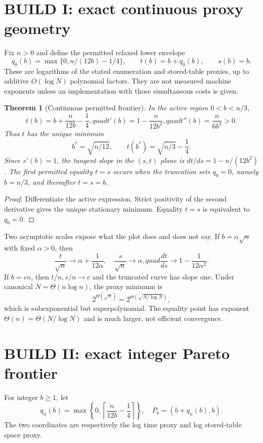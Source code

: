 \documentclass[11pt]{article}
\newtheorem{theorem}{Theorem}
\begin{document}
\section{BUILD I: exact continuous proxy geometry}
Fix $n>0$ and define the permitted relaxed lower envelope
\[
 q_0(b)=\max\{0,n/(12b)-1/4\},\qquad
 t(b)=b+q_0(b),\qquad s(b)=b.
\]
These are logarithms of the stated enumeration and stored-table proxies,
up to additive $O(\log N)$ polynomial factors.  They are not measured machine
exponents unless an implementation with those simultaneous costs is given.

\begin{theorem}[Continuous permitted frontier]
In the active region $0<b<n/3$,
\[
 t(b)=b+\frac{n}{12b}-\frac14,quad
 t'(b)=1-\frac{n}{12b^2},quad
 t''(b)=\frac{n}{6b^3}>0. \tag{1}
\]
Thus $t$ has the unique minimum
\[
 b^*=\sqrt{n/12},\qquad
 t(b^*)=\sqrt{n/3}-\frac14. \tag{2}
\]
Since $s'(b)=1$, the tangent slope in the $(s,t)$ plane is
$dt/ds=1-n/(12b^2)$.  The first permitted equality $t=s$ occurs when the
truncation sets $q_0=0$, namely $b=n/3$, and thereafter $t=s=b$.
\end{theorem}
\begin{proof}
Differentiate the active expression.  Strict positivity of the second
derivative gives the unique stationary minimum.  Equality $t=s$ is equivalent
to $q_0=0$.
\end{proof}

Two asymptotic scales expose what the plot does and does not say.  If
$b=\alpha\sqrt n$ with fixed $\alpha>0$, then
\[
 \frac{t}{\sqrt n}\longrightarrow
 \alpha+\frac{1}{12\alpha},\quad
 \frac{s}{\sqrt n}\longrightarrow\alpha,quad
 \frac{dt}{ds}\longrightarrow1-\frac{1}{12\alpha^2}. \tag{3}
\]
If $b=cn$, then $t/n,s/n\to c$ and the truncated curve has slope one.
Under canonical $N=\Theta(n\log n)$, the proxy minimum is
\[
 2^{\Theta(\sqrt n)}=
 2^{\Theta(\sqrt{N/\log N})}, \tag{4}
\]
which is subexponential but superpolynomial.  The equality point has exponent
$\Theta(n)=\Theta(N/\log N)$ and is much larger, not efficient convergence.

\section{BUILD II: exact integer Pareto frontier}
For integer $b\ge1$, let
\[
 q_n(b)=\max\left\{0,
 \left\lceil\frac{n}{12b}-\frac14\right\rceil\right\},
 \quad P_b=(b+q_n(b),b). \tag{5}
\]
The two coordinates are respectively the log time proxy and log stored-table
space proxy.
\end{document}
